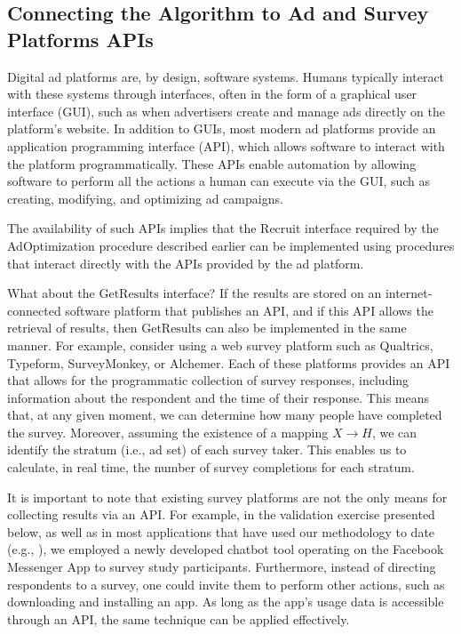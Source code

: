 \subsection{Connecting the Algorithm to Ad and Survey Platforms APIs}

Digital ad platforms are, by design, software systems. Humans typically interact with these systems through interfaces, often in the form of a graphical user interface (GUI), such as when advertisers create and manage ads directly on the platform's website. In addition to GUIs, most modern ad platforms provide an application programming interface (API), which allows software to interact with the platform programmatically. These APIs enable automation by allowing software to perform all the actions a human can execute via the GUI, such as creating, modifying, and optimizing ad campaigns.


The availability of such APIs implies that the Recruit interface required by the AdOptimization procedure described earlier can be implemented using procedures that interact directly with the APIs provided by the ad platform.

What about the \(\text{GetResults}\) interface? If the results are stored on an internet-connected software platform that publishes an API, and if this API allows the retrieval of results, then \(\text{GetResults}\) can also be implemented in the same manner. For example, consider using a web survey platform such as Qualtrics, Typeform, SurveyMonkey, or Alchemer. Each of these platforms provides an API that allows for the programmatic collection of survey responses, including information about the respondent and the time of their response. This means that, at any given moment, we can determine how many people have completed the survey. Moreover, assuming the existence of a mapping \( X \rightarrow H \), we can identify the stratum (i.e., ad set) of each survey taker. This enables us to calculate, in real time, the number of survey completions for each stratum.

It is important to note that existing survey platforms are not the only means for collecting results via an API.
For example, in the validation exercise presented below, as well as in most applications that have used our methodology to date 
(e.g., \citealt{donati2024can, donati2022marketing,  ichimiya2023evaluation, evans2023outcomes, agha2021drivers}), we employed a newly developed chatbot tool operating on the Facebook Messenger App to survey study participants. Furthermore, instead of directing respondents to a survey, one could invite them to perform other actions, such as downloading and installing an app. As long as the app's usage data is accessible through an API, the same technique can be applied effectively.

